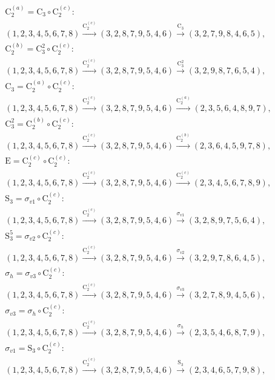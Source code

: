 \begin{align*}
& \mathrm{C}_{2}^{(a)} = \mathrm{C}_{3} \circ \mathrm{C}_{2}^{(c)}:\; \\& (1,2,3,4,5,6,7,8) \xrightarrow{\mathrm{C}_{2}^{(c)}} (3,2,8,7,9,5,4,6) \xrightarrow{\mathrm{C}_{3}} (3,2,7,9,8,4,6,5), \\
& \mathrm{C}_{2}^{(b)} = \mathrm{C}_{3}^{2} \circ \mathrm{C}_{2}^{(c)}:\; \\& (1,2,3,4,5,6,7,8) \xrightarrow{\mathrm{C}_{2}^{(c)}} (3,2,8,7,9,5,4,6) \xrightarrow{\mathrm{C}_{3}^{2}} (3,2,9,8,7,6,5,4), \\
& \mathrm{C}_{3} = \mathrm{C}_{2}^{(a)} \circ \mathrm{C}_{2}^{(c)}:\; \\& (1,2,3,4,5,6,7,8) \xrightarrow{\mathrm{C}_{2}^{(c)}} (3,2,8,7,9,5,4,6) \xrightarrow{\mathrm{C}_{2}^{(a)}} (2,3,5,6,4,8,9,7), \\
& \mathrm{C}_{3}^{2} = \mathrm{C}_{2}^{(b)} \circ \mathrm{C}_{2}^{(c)}:\; \\& (1,2,3,4,5,6,7,8) \xrightarrow{\mathrm{C}_{2}^{(c)}} (3,2,8,7,9,5,4,6) \xrightarrow{\mathrm{C}_{2}^{(b)}} (2,3,6,4,5,9,7,8), \\
& \mathrm{E} = \mathrm{C}_{2}^{(c)} \circ \mathrm{C}_{2}^{(c)}:\; \\& (1,2,3,4,5,6,7,8) \xrightarrow{\mathrm{C}_{2}^{(c)}} (3,2,8,7,9,5,4,6) \xrightarrow{\mathrm{C}_{2}^{(c)}} (2,3,4,5,6,7,8,9), \\
& \mathrm{S}_{3} = \sigma_{v1} \circ \mathrm{C}_{2}^{(c)}:\; \\& (1,2,3,4,5,6,7,8) \xrightarrow{\mathrm{C}_{2}^{(c)}} (3,2,8,7,9,5,4,6) \xrightarrow{\sigma_{v1}} (3,2,8,9,7,5,6,4), \\
& \mathrm{S}_{3}^{5} = \sigma_{v2} \circ \mathrm{C}_{2}^{(c)}:\; \\& (1,2,3,4,5,6,7,8) \xrightarrow{\mathrm{C}_{2}^{(c)}} (3,2,8,7,9,5,4,6) \xrightarrow{\sigma_{v2}} (3,2,9,7,8,6,4,5), \\
& \sigma_{h} = \sigma_{v3} \circ \mathrm{C}_{2}^{(c)}:\; \\& (1,2,3,4,5,6,7,8) \xrightarrow{\mathrm{C}_{2}^{(c)}} (3,2,8,7,9,5,4,6) \xrightarrow{\sigma_{v3}} (3,2,7,8,9,4,5,6), \\
& \sigma_{v3} = \sigma_{h} \circ \mathrm{C}_{2}^{(c)}:\; \\& (1,2,3,4,5,6,7,8) \xrightarrow{\mathrm{C}_{2}^{(c)}} (3,2,8,7,9,5,4,6) \xrightarrow{\sigma_{h}} (2,3,5,4,6,8,7,9), \\
& \sigma_{v1} = \mathrm{S}_{3} \circ \mathrm{C}_{2}^{(c)}:\; \\& (1,2,3,4,5,6,7,8) \xrightarrow{\mathrm{C}_{2}^{(c)}} (3,2,8,7,9,5,4,6) \xrightarrow{\mathrm{S}_{3}} (2,3,4,6,5,7,9,8), \\

\end{align*}
